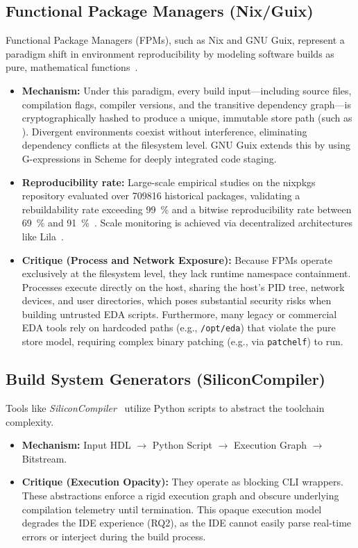 \subsection{Functional Package Managers (Nix/Guix)}
Functional Package Managers (FPMs), such as Nix and GNU Guix, represent a paradigm shift in environment reproducibility by modeling software builds as pure, mathematical functions~\cite{courtes2013functional}.
\begin{itemize}
    \item \textbf{Mechanism:} Under this paradigm, every build input---including source files, compilation flags, compiler versions, and the transitive dependency graph---is cryptographically hashed to produce a unique, immutable store path (such as \allowbreak{}). Divergent environments coexist without interference, eliminating dependency conflicts at the filesystem level. GNU Guix extends this by using G-expressions in Scheme for deeply integrated code staging.
    \item \textbf{Reproducibility rate:} Large-scale empirical studies on the nixpkgs repository evaluated over \num{709816} historical packages, validating a rebuildability rate exceeding \SI{99}{\percent} and a bitwise reproducibility rate between \SI{69}{\percent} and \SI{91}{\percent}~\cite{Malka2025DoesFunctional}. Scale monitoring is achieved via decentralized architectures like Lila~\cite{Malka2026Lila}.
    \item \textbf{Critique (Process and Network Exposure):} Because FPMs operate exclusively at the filesystem level, they lack runtime namespace containment. Processes execute directly on the host, sharing the host's PID tree, network devices, and user directories, which poses substantial security risks when building untrusted EDA scripts. Furthermore, many legacy or commercial EDA tools rely on hardcoded paths (e.g., \texttt{/opt/eda}) that violate the pure store model, requiring complex binary patching (e.g., via \texttt{patchelf}) to run.
\end{itemize}

\subsection{Build System Generators (SiliconCompiler)}
Tools like \textit{SiliconCompiler}~\cite{siliconcompiler} utilize Python scripts to abstract the toolchain complexity. 
\begin{itemize}
    \item \textbf{Mechanism:} Input HDL $\rightarrow$ Python Script $\rightarrow$ Execution Graph $\rightarrow$ Bitstream.
    \item \textbf{Critique (Execution Opacity):} They operate as blocking CLI wrappers. These abstractions enforce a rigid execution graph and obscure underlying compilation telemetry until termination. This opaque execution model degrades the IDE experience (RQ2), as the IDE cannot easily parse real-time errors or interject during the build process.
\end{itemize}

